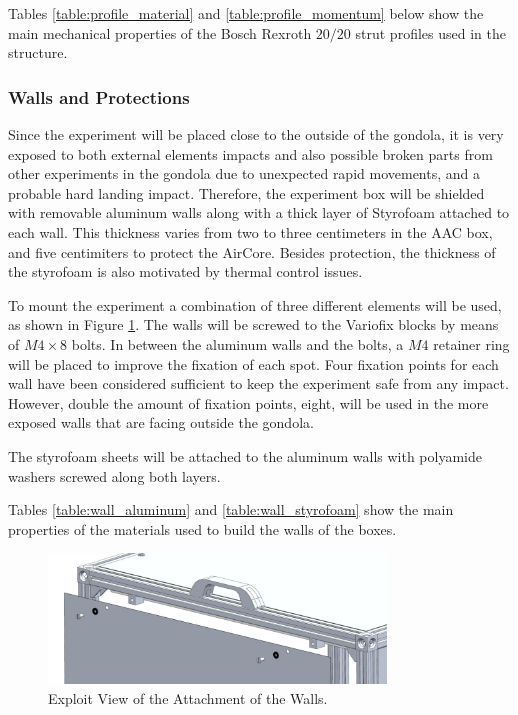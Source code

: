 \bigskip
Tables \ref{table:profile_material} and \ref{table:profile_momentum} below show the main mechanical properties of the Bosch Rexroth $20/20$ strut profiles used in the structure.



\smallskip

\subsubsection{Walls and Protections}
\label{sec:4.4.2}

Since the experiment will be placed close to the outside of the gondola, it is very exposed to both external elements impacts and also possible broken parts from other experiments in the gondola due to unexpected rapid movements, and a probable hard landing impact. Therefore, the experiment box will be shielded with removable aluminum walls along with a thick layer of Styrofoam attached to each wall. This thickness varies from two to three centimeters in the AAC box, and five centimiters to protect the AirCore. Besides protection, the thickness of the styrofoam is also motivated by thermal control issues.

To mount the experiment a combination of three different elements will be used, as shown in Figure \ref{fig:wall_attach}. The walls will be screwed to the Variofix blocks by means of $M4\times8$ bolts. In between the aluminum walls and the bolts, a $M4$ retainer ring will be placed to improve the fixation of each spot. Four fixation points for each wall have been considered sufficient to keep the experiment safe from any impact. However, double the amount of fixation points, eight, will be used in the more exposed walls that are facing outside the gondola.

The styrofoam sheets will be attached to the aluminum walls with polyamide washers screwed along both layers.

Tables \ref{table:wall_aluminum} and \ref{table:wall_styrofoam} show the main properties of the materials used to build the walls of the boxes.

 \begin{figure}[H]
     \centering
     \includegraphics[width=0.8\textwidth]{4-experiment-design/img/Mechanical/wall_attachment.jpg}
     \caption{Exploit View of the Attachment of the Walls.}
     \label{fig:wall_attach}
\end{figure}

